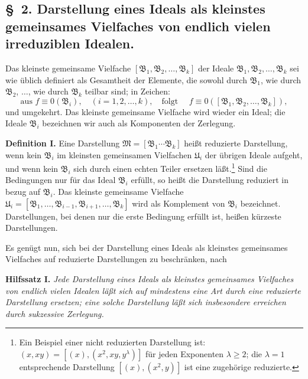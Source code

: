 \documentclass[11pt]{article}
\newcommand{\ideal}[1]{\mathfrak{#1}}
\begin{document}
\subsection*{\S~2. Darstellung eines Ideals als kleinstes gemeinsames Vielfaches von endlich vielen irreduziblen Idealen.}

Das kleinste gemeinsame Vielfache $[\ideal B_1,\ideal B_2,\ldots,\ideal B_k]$ der Ideale $\ideal B_1,\ideal B_2,\ldots,\ideal B_k$ sei wie üblich definiert als Gesamtheit der Elemente, die sowohl durch $\ideal B_1$, wie durch $\ideal B_2$, $\ldots$, wie durch $\ideal B_k$ teilbar sind; in Zeichen:
\[
 \text{aus } f\equiv0(\ideal B_i),\quad (i=1,2,\ldots,k),
 \quad\text{folgt }\quad
 f\equiv0([\ideal B_1,\ideal B_2,\ldots,\ideal B_k]),
\]
und umgekehrt. Das kleinste gemeinsame Vielfache wird wieder ein Ideal; die Ideale $\ideal B_i$ bezeichnen wir auch als Komponenten der Zerlegung.

\textbf{Definition I.} Eine Darstellung $\ideal M=[\ideal B_1\cdots\ideal B_k]$ heißt reduzierte Darstellung, wenn kein $\ideal B_i$ im kleinsten gemeinsamen Vielfachen $\ideal U_i$ der übrigen Ideale aufgeht, und wenn kein $\ideal B_i$ sich durch einen echten Teiler ersetzen läßt.\footnote{Ein Beispiel einer nicht reduzierten Darstellung ist: $(x,xy)=[(x),(x^2,xy,y^\lambda)]$ für jeden Exponenten $\lambda\ge2$; die $\lambda=1$ entsprechende Darstellung $[(x),(x^2,y)]$ ist eine zugehörige reduzierte.} Sind die Bedingungen nur für das Ideal $\ideal B_i$ erfüllt, so heißt die Darstellung reduziert in bezug auf $\ideal B_i$. Das kleinste gemeinsame Vielfache $\ideal U_i=[\ideal B_1,\ldots,\ideal B_{i-1},\ideal B_{i+1},\ldots,\ideal B_k]$ wird als Komplement von $\ideal B_i$ bezeichnet. Darstellungen, bei denen nur die erste Bedingung erfüllt ist, heißen kürzeste Darstellungen.

Es genügt nun, sich bei der Darstellung eines Ideals als kleinstes gemeinsames Vielfaches auf reduzierte Darstellungen zu beschränken, nach

\textbf{Hilfssatz I.} \emph{Jede Darstellung eines Ideals als kleinstes gemeinsames Vielfaches von endlich vielen Idealen läßt sich auf mindestens eine Art durch eine reduzierte Darstellung ersetzen; eine solche Darstellung läßt sich insbesondere erreichen durch sukzessive Zerlegung.}
\end{document}
